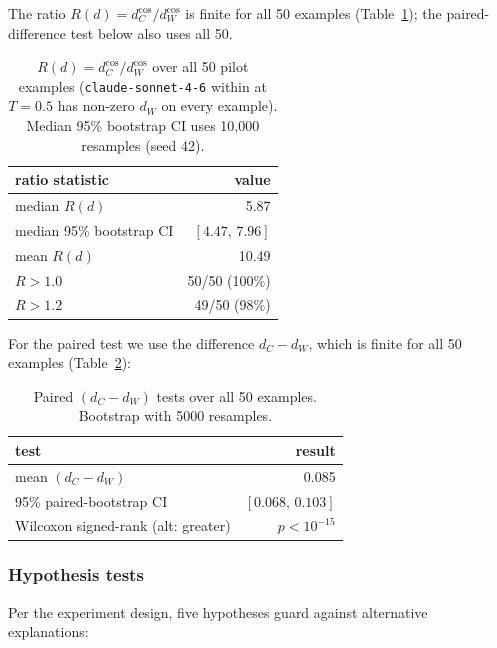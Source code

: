 The ratio $R(d) = d_C^{\cos} / d_W^{\cos}$ is finite for all 50 examples (Table~\ref{tab:rd}); the paired-difference test below also uses all 50.

\begin{table}[t]
\centering
\caption{$R(d) = d_C^{\cos} / d_W^{\cos}$ over all 50 pilot examples (\texttt{claude-sonnet-4-6} within at $T=0.5$ has non-zero $d_W$ on every example). Median 95\% bootstrap CI uses 10{,}000 resamples (seed 42).}
\label{tab:rd}
\begin{tabular}{lr}
\toprule
\textbf{ratio statistic} & \textbf{value} \\
\midrule
median $R(d)$               & 5.87 \\
median 95\% bootstrap CI    & $[4.47,\, 7.96]$ \\
mean $R(d)$                 & 10.49 \\
$R > 1.0$                   & 50/50 (100\%) \\
$R > 1.2$                   & 49/50 (98\%) \\
\bottomrule
\end{tabular}
\end{table}

For the paired test we use the difference $d_C - d_W$, which is finite for all 50 examples (Table~\ref{tab:paired}):

\begin{table}[t]
\centering
\caption{Paired $(d_C - d_W)$ tests over all 50 examples. Bootstrap with 5000 resamples.}
\label{tab:paired}
\begin{tabular}{lr}
\toprule
\textbf{test} & \textbf{result} \\
\midrule
mean $(d_C - d_W)$                       & 0.085 \\
95\% paired-bootstrap CI                 & $[0.068,\, 0.103]$ \\
Wilcoxon signed-rank (alt: greater)      & $p < 10^{-15}$ \\
\bottomrule
\end{tabular}
\end{table}

\subsubsection{Hypothesis tests}
\label{sec:results:exp1b:hypotheses}

Per the experiment design, five hypotheses guard against alternative explanations:

